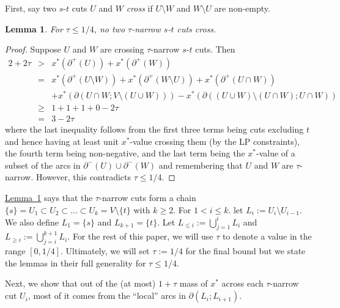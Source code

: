 \documentclass[11pt]{article}
\newcommand{\lref}[2][]{\hyperref[#2]{#1~\ref*{#2}}}
\newtheorem{lemma}[theorem]{Lemma}
\theoremstyle{definition}
\newcounter{note}[section]
\begin{document}
First, say two $s$-$t$ cuts $U$ and $W$ \emph{cross} if $U\setminus W$
and $W \setminus U$ are
non-empty. 

\begin{lemma}
  \label{lem:nocross}
  For $\tau \leq 1/4$, no two $\tau$-narrow $s$-$t$ cuts cross.
\end{lemma}
\begin{proof}
  Suppose $U$ and $W$ are crossing $\tau$-narrow $s$-$t$ cuts. Then
  \begin{eqnarray*}
    2 + 2\tau & > & x^*(\partial^+(U)) + x^*(\partial^+(W)) \\
    & = & x^*(\partial^+(U \setminus W)) + x^*(\partial^+(W \setminus U)) + x^*(\partial^+(U \cap W)) \\ & &+ x^*(\partial(U \cap W; V \setminus (U \cup W))) - x^*(\partial((U \cup W) \setminus (U \cap W) ; U \cap W)) \\
    & \geq & 1 + 1 + 1 + 0 - 2\tau \\
    & = & 3 - 2\tau
  \end{eqnarray*}
  where the last inequality follows from the first three terms being
  cuts excluding $t$ and hence having at least unit $x^*$-value crossing them (by the
  LP constraints), the fourth term being non-negative, and the last term
  being the $x^*$-value of a subset of the arcs in $\partial^-(U) \cup
  \partial^-(W)$ and remembering that $U$ and $W$ are $\tau$-narrow.
  However, this contradicts $\tau \leq 1/4$.
\end{proof}

\lref[Lemma]{lem:nocross} says that the $\tau$-narrow cuts form a chain
$\{s\} = U_1 \subset U_2 \subset \ldots \subset U_k = V\setminus\{t\}$ with $k \geq 2$.
For $1 < i \leq k$. let $L_i := U_i \setminus U_{i-1}$. We also define
$L_1 = \{s\}$ and $L_{k+1}=\{t\}$. Let $L_{\leq i} := \bigcup_{j = 1}^i L_i$ and $L_{\geq
  i} := \bigcup_{j=i}^{k+1} L_i$.
For the rest of this paper, we will use $\tau$ to denote a value in the range $[0, 1/4]$.
Ultimately, we will set $\tau := 1/4$ for the final bound but we state the lemmas
in their full generality for $\tau \leq 1/4$.


Next, we show that out of the (at most) $1+\tau$ mass of $x^*$ across
each $\tau$-narrow cut $U_i$, most of it comes from the ``local'' arcs
in $\partial(L_i; L_{i+1})$.
\end{document}
